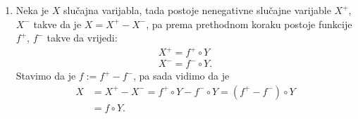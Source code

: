 \begin{rj}[\ref{zad:3.20}]
\begin{itemize}
\begin{enumerate}[label=(\arabic*. korak)]
            Neka su $\omega, \; \omega' \in \Omega$ takve da $Y(\omega) = Y(\omega')$, te vrijedi $X(\omega) \neq X(\omega')$.
            Sada postoje disjunktni Borelovi skupovi $B, \; B' \in \borel{\real}$ takvi da $X(\omega) \in B$, $X(\omega') \in B'$.
            Tako\dj er vrijedi $\{X \in B \cap B'\} = \underbrace{\{X \in B\}}_{\in \sigAlg{Y}} \cap \underbrace{\{X \in B'\}}_{\in \sigAlg{Y}} = \varnothing$.
            Sada znamo da postoje $A, \, A' \in \famE$ takvi da je $\omega \in \{Y \in A\} = \{X \in B\}$, $\omega' \in \{Y \in A'\} = \{X \in B'\}$.
            Kako je $Y(\omega) = Y (\omega')$, slijedi da je $Y(\omega) = Y(\omega') \in A \cap A'$, me\dj utim vrijedi $\{Y \in A\} \cup \{Y \in A'\} = \{Y \in A \cup A'\} = \varnothing$, \v sto je kontradikcija.
            Dakle $\tilde{f}$ je dobro definirana na $R_Y$, sada definiramo $f : E \to \real$ sa:
            \begin{equation*}
                f(\omega) :=
                \begin{cases}
                    \tilde{f} (\omega), &\omega \in R_Y\\
                    0, &\omega \notin R_Y.
                \end{cases}
            \end{equation*}
            Primjetimo da je sada za gotovo svaki $\omega \in \Omega$
            \begin{equation*}
                \begin{aligned}
                X(\omega) &= \lim\limits_{n \to \infty} f_n (Y(\omega)) = \tilde{f}(Y(\omega)) = f(Y(\omega))\\
                &= (f \circ Y) (\omega).
                \end{aligned}
            \end{equation*}
            \item Neka je $X$ slu\v cajna varijabla, tada postoje nenegativne slu\v cajne varijable $X^+$, $X^-$ takve da je $X = X^+ - X^-$, pa prema prethodnom koraku postoje funkcije $f^+$, $f^-$ takve da vrijedi:
            \begin{equation*}
                \begin{aligned}
                   X^+ = f^+ \circ Y\\
                   X^- = f^- \circ Y.
                \end{aligned}
            \end{equation*}
            Stavimo da je $f:= f^+ - f^-$, pa sada vidimo da je
            \begin{equation*}
                \begin{aligned}
                    X &= X^+ - X^- = f^+ \circ Y - f^- \circ Y = (f^+ - f^-) \circ Y\\
                    &= f \circ Y.
                \end{aligned}
            \end{equation*}
        \end{enumerate}
        

\end{itemize}
\end{rj}
